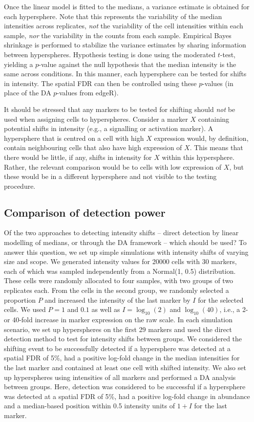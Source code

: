 \documentclass{article}
\begin{document}
Once the linear model is fitted to the medians, a variance estimate is obtained for each hypersphere.
Note that this represents the variability of the median intensities across replicates, \textit{not} the variability of the cell intensities within each sample, \textit{nor} the variability in the counts from each sample.
Empirical Bayes shrinkage is performed to stabilize the variance estimates by sharing information between hyperspheres.
Hypothesis testing is done using the moderated $t$-test, yielding a $p$-value against the null hypothesis that the median intensity is the same across conditions. 
In this manner, each hypersphere can be tested for shifts in intensity.
The spatial FDR can then be controlled using these $p$-values (in place of the DA $p$-values from edgeR). 

It should be stressed that any markers to be tested for shifting should \textit{not} be used when assigning cells to hyperspheres.
Consider a marker $X$ containing potential shifts in intensity (e.g., a signalling or activation marker).
A hypersphere that is centred on a cell with high $X$ expression would, by definition, contain neighbouring cells that also have high expression of $X$.
This means that there would be little, if any, shifts in intensity for $X$ within this hypersphere.
Rather, the relevant comparison would be to cells with low expression of $X$, but these would be in a different hypersphere and not visible to the testing procedure.

\subsection{Comparison of detection power}
Of the two approaches to detecting intensity shifts -- direct detection by linear modelling of medians, or through the DA framework -- which should be used?
To answer this question, we set up simple simulations with intensity shifts of varying size and scope.
We generated intensity values for 20000 cells with 30 markers, each of which was sampled independently from a Normal(1, 0.5) distribution.
These cells were randomly allocated to four samples, with two groups of two replicates each.
From the cells in the second group, we randomly selected a proportion $P$ and increased the intensity of the last marker by $I$ for the selected cells.
We used $P=1$ and $0.1$ as well as $I=\log_{10}(2)$ and $\log_{10}(40)$, i.e., a 2- or 40-fold increase in marker expression on the raw scale.
In each simulation scenario, we set up hyperspheres on the first 29 markers and used the direct detection method to test for intensity shifts between groups.
We considered the shifting event to be successfully detected if a hypersphere was detected at a spatial FDR of 5\%, had a positive log-fold change in the median intensities for the last marker and contained at least one cell with shifted intensity.
We also set up hyperspheres using intensities of all markers and performed a DA analysis between groups.
Here, detection was considered to be successful if a hypersphere was detected at a spatial FDR of 5\%, had a positive log-fold change in abundance and a median-based position within 0.5 intensity units of $1+I$ for the last marker.
\end{document}
